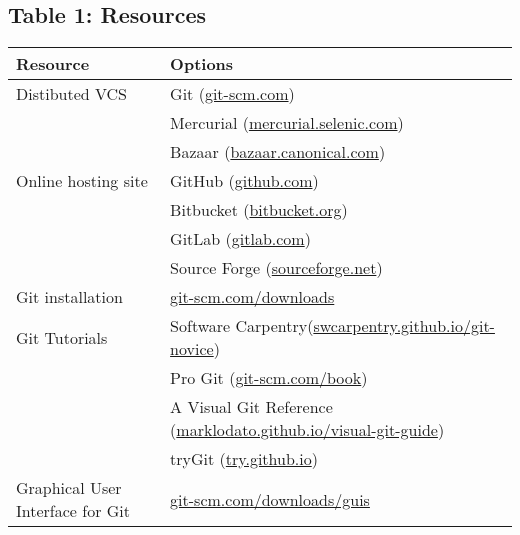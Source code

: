 \subsection*{Table 1: Resources}

\begin{tabular}{|l|l|}
    \hline
    \textbf{Resource} & \textbf{Options} \\ \hline
    Distibuted VCS & Git (\href{https://git-scm.com}{git-scm.com}) \\ \hline
                   & Mercurial (\href{https://mercurial.selenic.com}{mercurial.selenic.com}) \\ \hline
                   & Bazaar (\href{http://bazaar.canonical.com}{bazaar.canonical.com}) \\ \hline
    Online hosting site & GitHub (\href{https://github.com}{github.com}) \\ \hline
                        & Bitbucket (\href{https://bitbucket.org}{bitbucket.org}) \\ \hline
                        & GitLab (\href{https://about.gitlab.com}{gitlab.com}) \\ \hline
                        & Source Forge (\href{http://sourceforge.net}{sourceforge.net}) \\ \hline
    Git installation & \href{https://git-scm.com/downloads}{git-scm.com/downloads} \\ \hline
    Git Tutorials & Software Carpentry(\href{https://swcarpentry.github.io/git-novice}{swcarpentry.github.io/git-novice}) \\ \hline
                  & Pro Git (\href{https://git-scm.com/book}{git-scm.com/book}) \\ \hline
                  & A Visual Git Reference (\href{https://marklodato.github.io/visual-git-guide}{marklodato.github.io/visual-git-guide}) \\ \hline
                  & tryGit (\href{https://try.github.io}{try.github.io}) \\ \hline
    Graphical User Interface for Git & \href{https://git-scm.com/downloads/guis}{git-scm.com/downloads/guis} \\ \hline
\end{tabular}
